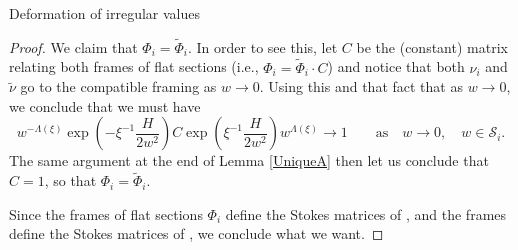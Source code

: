 \documentclass[11pt]{article}
\numberwithin{equation}{section}
\numberwithin{equation}{section}
\begin{document}
\begin{subsubsection}{Deformation of irregular values}
\begin{proof}
We claim that $\Phi_i=\widetilde{\Phi}_i$. In order to see this, let $C$ be the (constant) matrix relating both frames of flat sections (i.e., $\Phi_i=\widetilde{\Phi}_i \cdot C$) and notice that both $\nu_i$ and $\widetilde{\nu}$ go to the compatible framing  as $w\to 0$. Using this and that fact that  as $w\to 0$, we conclude that we must have{\samepage
\begin{equation*}
 w^{-\Lambda(\xi)}\exp \left(-\xi^{-1}\frac{H}{2w^2}\right)C\exp \left(\xi^{-1}\frac{H}{2w^2}\right)w^{\Lambda(\xi)} \to 1\qquad \text{as} \quad w\to 0,\quad w\in \mathcal{S}_i.
\end{equation*}
The same argument at the end of Lemma \ref{UniqueA} then let us conclude that $C=1$, so that $\Phi_i=\widetilde{\Phi}_i$.}

Since the frames of flat sections $\Phi_i$ define the Stokes matrices of , and the frames  define the Stokes matrices of , we conclude what we want.
\end{proof}
\end{subsubsection}
\end{document}
